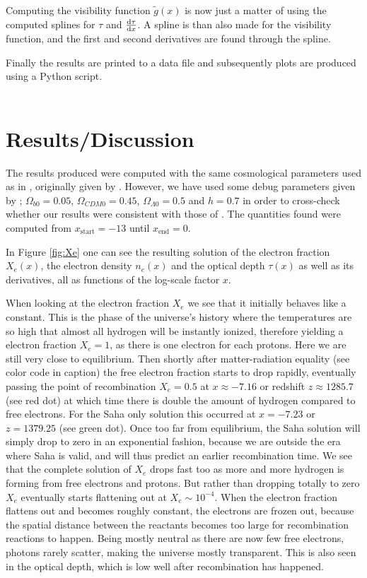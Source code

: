\documentclass[twocolumn]{aastex62}
\begin{document}
Computing the visibility function $\tilde{g}(x)$ is now just a matter of using the computed splines for $\tau$ and $\dv{\tau}{x}$. A spline is than also made for the visibility function, and the first and second derivatives are found through the spline. 

Finally the results are printed to a data file and subsequently plots are produced using a Python script.
\\\\
\section{Results/Discussion}\label{sec:Results}
The results produced were computed with the same cosmological parameters used as in \cite{stutzer:2020}, originally given by \cite{callin:2006}. However, we have used some debug parameters given by \cite{winther:2020}; $\Omega_{b0} = 0.05$, $\Omega_{CDM0} = 0.45$, $\Omega_{\Lambda 0} = 0.5$ and $h = 0.7$ in order to cross-check whether our results were consistent with those of \cite{winther:2020}. The quantities found were computed from $x_\text{start} = -13$ until $x_\text{end} = 0$.

In Figure \ref{fig:Xe} one can see the resulting solution of the electron fraction $X_e(x)$, the electron density $n_e(x)$ and the optical depth $\tau(x)$ as well as its derivatives, all as functions of the log-scale factor $x$. 

When looking at the electron fraction $X_e$ we see that it initially behaves like a constant. This is the phase of the universe's history where the temperatures are so high that almost all hydrogen will be instantly ionized, therefore yielding a electron fraction $X_e = 1$, as there is one electron for each protons. Here we are still very close to equilibrium. Then shortly after matter-radiation equality (see color code in caption) the free electron fraction starts to drop rapidly, eventually passing the point of recombination $X_e = 0.5$ at $x \approx -7.16$ or redshift $z \approx 1285.7$ (see red dot) at which time there is double the amount of hydrogen compared to free electrons. For the Saha only solution this occurred at $x = -7.23$ or $z = 1379.25$ (see green dot). Once too far from equilibrium, the Saha solution will simply drop to zero in an exponential fashion, because we are outside the era where Saha is valid, and will thus predict an earlier recombination time. We see that the complete solution of $X_e$ drops fast too as more and more hydrogen is forming from free electrons and protons. But rather than dropping totally to zero $X_e$ eventually starts flattening out at $X_e \sim 10^{-4}$. When the electron fraction flattens out and becomes roughly constant, the electrons are frozen out, because the spatial distance between the reactants becomes too large for recombination reactions to happen. Being mostly neutral as there are now few free electrons, photons rarely scatter, making the universe mostly transparent. This is also seen in the optical depth, which is low well after recombination has happened.
\end{document}
